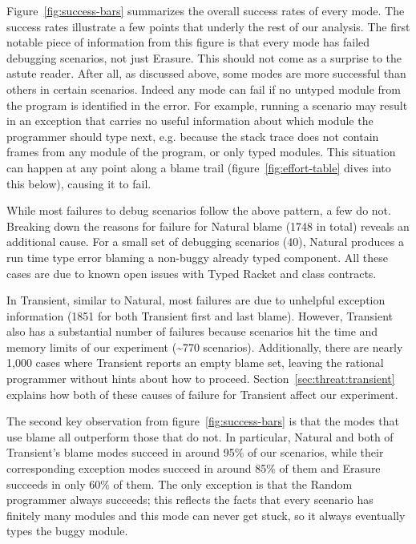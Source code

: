 Figure~\ref{fig:success-bars} summarizes the overall success rates of every mode.
The success rates illustrate a few points that underly the rest of our analysis.
The first notable piece of information from
this figure is that every mode has failed debugging scenarios, not just
Erasure. This should
not come as a surprise to the astute
reader. After all, as
discussed above, some modes are more successful than others in certain
scenarios. Indeed any mode can fail if no untyped module from the program is identified in the error.
For example, running a scenario may result in an
exception that carries no useful information about which
module the programmer should type next, e.g. because the stack trace
does not contain frames from any module of the program, or only typed modules. This situation
can happen at any point along a blame trail (figure~\ref{fig:effort-table} dives into this below), causing it to fail.

While most failures to debug scenarios follow the above pattern, a few do
not.  Breaking down the reasons for failure for Natural blame (1748 in
total) reveals an additional cause. For a small set of debugging scenarios
(40), Natural produces a run time type error blaming a non-buggy already
typed component. All these cases are due to known open issues with Typed
Racket and class contracts. 

In Transient, similar to Natural,
most failures are due to unhelpful exception information (1851 for both
Transient first and last blame).  
However, Transient also has a substantial
number of failures because scenarios hit the time and memory
limits of our experiment (\textasciitilde770 scenarios).  Additionally, there are nearly 1,000 cases where
Transient reports an empty blame set, leaving the rational programmer
without hints about how to proceed.
Section~\ref{sec:threat:transient} explains how both of these causes of
failure for Transient affect our experiment. 

The second key observation from figure~\ref{fig:success-bars} is that the modes that use blame all outperform those that do not.
In particular, Natural and both of Transient's blame modes succeed in around 95\% of our scenarios, while their corresponding exception modes succeed in around 85\% of them and Erasure succeeds in only 60\% of them.
The only exception is that the Random programmer always succeeds;
this reflects the facts that every scenario has finitely many modules and this mode can never get stuck, so it always eventually types the buggy module.


